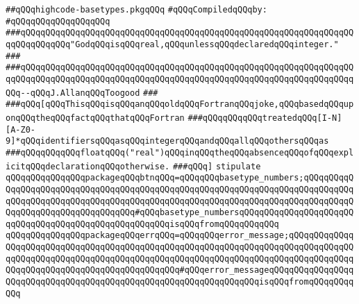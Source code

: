 \label{src/lib/compiler/back/top/highcode/highcode-basetypes.pkg}
\verb|##qQQqhighcode-basetypes.pkgqQQq|\newline
\newline
\verb|#qQQqCompiledqQQqby:|\newline
\verb|#qQQqqQQqqQQqqQQqqQQq|\newline
\newline
\newline
\verb|###qQQqqQQqqQQqqQQqqQQqqQQqqQQqqQQqqQQqqQQqqQQqqQQqqQQqqQQqqQQqqQQqqQQqqQQqqQQqqQQq"GodqQQqisqQQqreal,qQQqunlessqQQqdeclaredqQQqinteger."|\newline
\verb|###|\newline
\verb|###qQQqqQQqqQQqqQQqqQQqqQQqqQQqqQQqqQQqqQQqqQQqqQQqqQQqqQQqqQQqqQQqqQQqqQQqqQQqqQQqqQQqqQQqqQQqqQQqqQQqqQQqqQQqqQQqqQQqqQQqqQQqqQQqqQQqqQQqqQQq--qQQqJ.AllanqQQqToogood|\newline
\verb|###|\newline
\verb|###qQQq[qQQqThisqQQqisqQQqanqQQqoldqQQqFortranqQQqjoke,qQQqbasedqQQquponqQQqtheqQQqfactqQQqthatqQQqFortran|\newline
\verb|###qQQqqQQqqQQqtreatedqQQq[I-N][A-Z0-9]*qQQqidentifiersqQQqasqQQqintegerqQQqandqQQqallqQQqothersqQQqas|\newline
\verb|###qQQqqQQqqQQqfloatqQQq("real")qQQqinqQQqtheqQQqabsenceqQQqofqQQqexplicitqQQqdeclarationqQQqotherwise.|\newline
\verb|###qQQq]|\newline
\newline
\newline
\verb|stipulate|\newline
\verb|qQQqqQQqqQQqqQQqpackageqQQqbtnqQQq=qQQqqQQqbasetype_numbers;qQQqqQQqqQQqqQQqqQQqqQQqqQQqqQQqqQQqqQQqqQQqqQQqqQQqqQQqqQQqqQQqqQQqqQQqqQQqqQQqqQQqqQQqqQQqqQQqqQQqqQQqqQQqqQQqqQQqqQQqqQQqqQQqqQQqqQQqqQQqqQQqqQQqqQQqqQQqqQQqqQQqqQQqqQQqqQQq#qQQqbasetype_numbersqQQqqQQqqQQqqQQqqQQqqQQqqQQqqQQqqQQqqQQqqQQqqQQqqQQqqQQqisqQQqfromqQQqqQQqqQQq|\newline
\verb|qQQqqQQqqQQqqQQqpackageqQQqerrqQQq=qQQqqQQqerror_message;qQQqqQQqqQQqqQQqqQQqqQQqqQQqqQQqqQQqqQQqqQQqqQQqqQQqqQQqqQQqqQQqqQQqqQQqqQQqqQQqqQQqqQQqqQQqqQQqqQQqqQQqqQQqqQQqqQQqqQQqqQQqqQQqqQQqqQQqqQQqqQQqqQQqqQQqqQQqqQQqqQQqqQQqqQQqqQQqqQQqqQQqqQQq#qQQqerror_messageqQQqqQQqqQQqqQQqqQQqqQQqqQQqqQQqqQQqqQQqqQQqqQQqqQQqqQQqqQQqqQQqqQQqisqQQqfromqQQqqQQqqQQq|\newline
